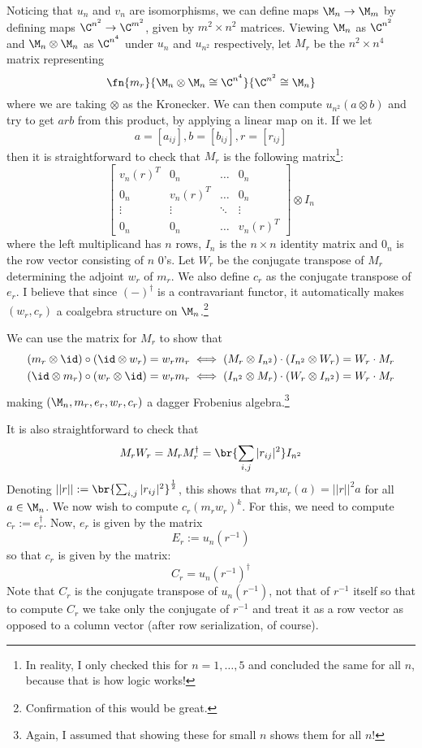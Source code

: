 \documentclass[./Thick_TQFTs_and_Quantum_Information.tex]{subfiles}
\begin{document}
Noticing that $u_n$ and $v_n$ are isomorphisms, we can define maps
$\M_n \to \M_m$ by defining maps $\C^{n^2} \to \C^{m^2}$, given by
$m^2 \times n^2$ matrices. Viewing $\M_n$ as $\C^{n^2}$ and $\M_n \otimes \M_n$
as $\C^{n^4}$ under $u_n$ and $u_{n^2}$ respectively, let $M_r$ be the
$n^2 \times n^4$ matrix representing
\[
  \fn{m_r}{\M_n \otimes \M_n \cong \C^{n^4}}{\C^{n^2} \cong \M_n}
\]
where we are taking $\otimes$ as the Kronecker. We can then compute
$u_{n^2}(a \otimes b)$ and try to get $arb$ from this product, by applying a
linear map on it. If we let
\[
  a = [a_{ij}], b = [b_{ij}], r = [r_{ij}]
\]
then it is straightforward to check that $M_r$ is the following
matrix\footnote{In reality, I only checked this for $n = 1, \dots, 5$ and
concluded the same for all $n$, because that is how logic works!}:
\[
  \begin{bmatrix}
    v_n(r)^T  & 0_n       & \dots   & 0_n     \\
    0_n       & v_n(r)^T  & \dots   & 0_n     \\
    \vdots    & \vdots    & \ddots  & \vdots  \\
    0_n       & 0_n       & \dots   & v_n(r)^T
  \end{bmatrix} \otimes I_{n}
\]
where the left multiplicand has $n$ rows, $I_n$ is the $n \times n$ identity
matrix and $0_n$ is the row vector consisting of $n$ $0$'s. Let
$W_r$ be the conjugate transpose of $M_r$ determining the adjoint $w_r$ of
$m_r$. We also define $c_r$ as the conjugate transpose of $e_r$. I believe that
since $(-)^{\dagger}$ is a contravariant functor, it automatically makes
$(w_r, c_r)$ a coalgebra structure on $\M_n$.\footnote{Confirmation of this
would be great.}

We can use the matrix for $M_r$ to show that
\begin{align*}
  (m_r \otimes \id) \circ (\id \otimes w_r) = w_rm_r
  &\iff (M_r \otimes I_{n^2}) \cdot (I_{n^2} \otimes W_r) = W_r \cdot M_r\\
  (\id \otimes m_r) \circ (w_r \otimes \id) = w_rm_r
  &\iff (I_{n^2} \otimes M_r) \cdot (W_r \otimes I_{n^2}) = W_r \cdot M_r
\end{align*}
making $(\M_n, m_r, e_r, w_r, c_r)$ a dagger Frobenius algebra.\footnote{Again,
I assumed that showing these for small $n$ shows them for all $n$!}

It is also straightforward to check that
\[
  M_rW_r = M_rM_r^{\dagger}
    = \br{\sum_{i, j} |r_{ij}|^2}I_{n^2}
\]
Denoting $||r|| := \br{\sum_{i, j} |r_{ij}|^2}^{\frac{1}{2}}$, this shows that
$m_rw_r(a) = ||r||^2a$ for all $a \in \M_n$. We now wish to compute
$c_r(m_rw_r)^k$. For this, we need to compute $c_r := e_r^{\dagger}$. Now,
$e_r$ is given by the matrix
\[
  E_r := u_n(r^{-1})
\]
so that $c_r$ is given by the matrix:
\[
  C_r = u_n(r^{-1})^{\dagger}
\]
Note that $C_r$ is the conjugate transpose of $u_n(r^{-1})$, not that of
$r^{-1}$ itself so that to compute $C_r$ we take only the conjugate of
$r^{-1}$ and treat it as a row vector as opposed to a column vector (after row
serialization, of course).
\end{document}
